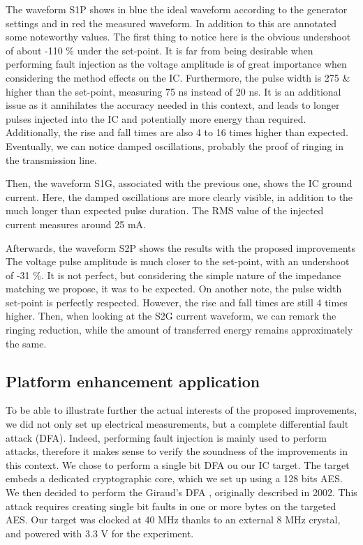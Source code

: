 		The waveform S1P shows in blue the ideal waveform according to the generator settings and in red the measured waveform.
		In addition to this are annotated some noteworthy values.
		The first thing to notice here is the obvious undershoot of about -110 \% under the set-point.
		It is far from being desirable when performing fault injection as the voltage amplitude is of great importance when considering the method effects on the IC.
		Furthermore, the pulse width is 275 \& higher than the set-point, measuring 75 ns instead of 20 ns.
		It is an additional issue as it annihilates the accuracy needed in this context, and leads to longer pulses injected into the IC and potentially more energy than required.
		Additionally, the rise and fall times are also 4 to 16 times higher than expected.
		Eventually, we can notice damped oscillations, probably the proof of ringing in the transmission line.

		Then, the waveform S1G, associated with the previous one, shows the IC ground current.
		Here, the damped oscillations are more clearly visible, in addition to the much longer than expected pulse duration.
		The RMS value of the injected current measures around 25 mA.

		Afterwards, the waveform S2P shows the results with the proposed improvements
		The voltage pulse amplitude is much closer to the set-point, with an undershoot of -31 \%.
		It is not perfect, but considering the simple nature of the impedance matching we propose, it was to be expected.
		On another note, the pulse width set-point is perfectly respected.
		However, the rise and fall times are still 4 times higher.
		Then, when looking at the S2G current waveform, we can remark the ringing reduction, while the amount of transferred energy remains approximately the same.

	\subsection{Platform enhancement application}
		To be able to illustrate further the actual interests of the proposed improvements, we did not only set up electrical measurements, but a complete differential fault attack (DFA).
		Indeed, performing fault injection is mainly used to perform attacks, therefore it makes sense to verify the soundness of the improvements in this context.
		We chose to perform a single bit DFA ou our IC target.
		The target embeds a dedicated cryptographic core, which we set up using a 128 bits AES.
		We then decided to perform the Giraud's DFA \cite{giraudDfa}, originally described in 2002.
		This attack requires creating single bit faults in one or more bytes on the targeted AES.
		Our target was clocked at 40 MHz thanks to an external 8 MHz crystal, and powered with 3.3 V for the experiment.

